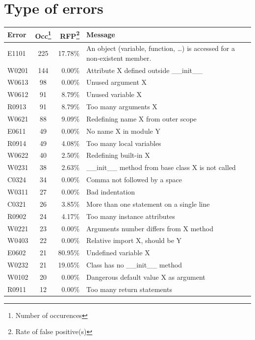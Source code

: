 \documentclass[11pt, a4paper]{article}
\begin{document}
\newpage
\section{Type of errors}

\begin{longtable}{|l|c|r|m{9cm}|}
\hline
\textbf{\small{Error}} & \textbf{\small{Occ\footnote{Number of occurences}}} & \textbf{\small{RFP\footnote{Rate of false positive(s)}}} & \textbf{\small{Message}} \\
\hline
\hline
E1101 & 225 & 17.78\% & An object (variable, function, \dots) is accessed for a non-existent member. \\
\hline
W0201 & 144 & 0.00\% & Attribute X defined outside \_\_init\_\_ \\
\hline
W0613 & 98 & 0.00\% & Unused argument X \\
\hline
W0612 & 91 & 8.79\% & Unused variable X \\
\hline
R0913 & 91 & 8.79\% & Too many arguments X \\
\hline
W0621 & 88 & 9.09\% & Redefining name X from outer scope \\
\hline
E0611 & 49 & 0.00\% & No name X in module Y \\
\hline
R0914 & 49 & 4.08\% & Too many local variables \\
\hline
W0622 & 40 & 2.50\% & Redefining built-in X \\
\hline
W0231 & 38 & 2.63\% & \_\_init\_\_ method from base class X is not called \\
\hline
C0324 & 34 & 0.00\% & Comma not followed by a space \\
\hline
W0311 & 27 & 0.00\% & Bad indentation \\
\hline
C0321 & 26 & 3.85\% & More than one statement on a single line \\
\hline
R0902 & 24 & 4.17\% & Too many instance attributes \\
\hline
W0221 & 23 & 0.00\% & Arguments number differs from X method \\
\hline
W0403 & 22 & 0.00\% & Relative import X, should be Y \\
\hline
E0602 & 21 & 80.95\% & Undefined variable X \\
\hline
W0232 & 21 & 19.05\% & Class has no \_\_init\_\_ method \\
\hline
W0102 & 20 & 0.00\% & Dangerous default value X as argument \\
\hline
R0911 & 12 & 0.00\% & Too many return statements \\

\end{longtable}
\end{document}
